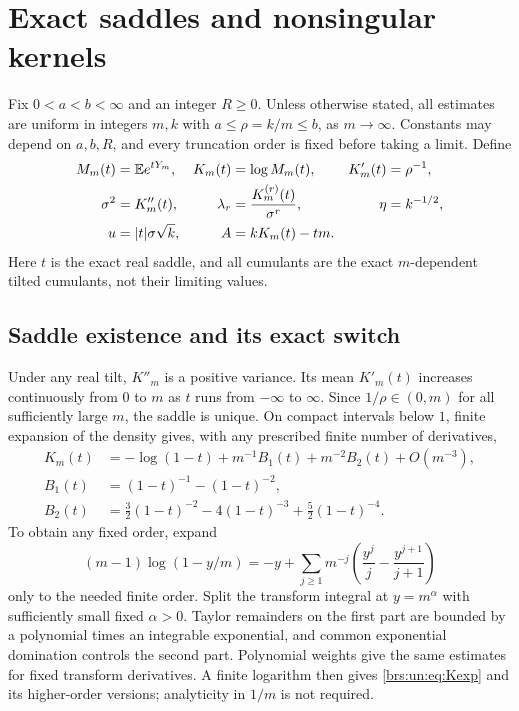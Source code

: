 \documentclass[11pt]{article}
\numberwithin{equation}{section}
\theoremstyle{remark}\newtheorem{remark}[theorem]{Remark}
\begin{document}
\section{Exact saddles and nonsingular kernels}\label{brs:un:sec:setup}

Fix $0<a<b<\infty$ and an integer $R\ge0$.  Unless otherwise stated,
all estimates are uniform in integers $m,k$ with
$a\le\rho=k/m\le b$, as $m\to\infty$.  Constants may depend on
$a,b,R$, and every truncation order is fixed before taking a limit.
Define
\begin{align}\label{brs:un:eq:parameters}
 M_m(t)&=\mathbb E e^{tY_m},&K_m(t)&=\log M_m(t),&
 K'_m(t)&=\rho^{-1},\\
 \sigma^2&=K''_m(t),&\lambda_r&=\frac{K_m^{(r)}(t)}{\sigma^r},&
 \eta&=k^{-1/2},\nonumber\\
 u&=|t|\sigma\sqrt{k},& A&=kK_m(t)-tm.&&\nonumber
\end{align}
Here $t$ is the exact real saddle, and all cumulants are the exact
$m$-dependent tilted cumulants, not their limiting values.

\subsection{Saddle existence and its exact switch}

Under any real tilt, $K''_m$ is a positive variance.  Its mean $K'_m(t)$
increases continuously from $0$ to $m$ as $t$ runs from $-\infty$ to
$\infty$.  Since $1/\rho\in(0,m)$ for all sufficiently large $m$, the
saddle is unique.  On compact intervals below $1$, finite expansion of
the density gives, with any prescribed finite number of derivatives,
\begin{align}\label{brs:un:eq:Kexp}
 K_m(t)&=-\log(1-t)+m^{-1}B_1(t)+m^{-2}B_2(t)+O(m^{-3}),\\
 B_1(t)&=(1-t)^{-1}-(1-t)^{-2},\nonumber\\
 B_2(t)&=\tfrac32(1-t)^{-2}-4(1-t)^{-3}
                 +\tfrac52(1-t)^{-4}.\nonumber
\end{align}
To obtain any fixed order, expand
\[
 (m-1)\log(1-y/m)
 =-y+\sum_{j\ge1}m^{-j}
       \left(\frac{y^j}{j}-\frac{y^{j+1}}{j+1}\right)
\]
only to the needed finite order.  Split the transform integral at
$y=m^\alpha$ with sufficiently small fixed $\alpha>0$.  Taylor
remainders on the first part are bounded by a polynomial times an
integrable exponential, and common exponential domination controls the
second part.  Polynomial weights give the same estimates for fixed
transform derivatives.  A finite logarithm then gives
\eqref{brs:un:eq:Kexp} and its higher-order versions; analyticity in $1/m$ is
not required.
\end{document}
